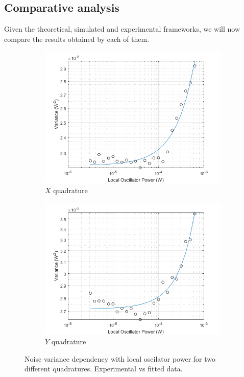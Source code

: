 \subsection{Comparative analysis}
%
%
Given the theoretical, simulated and experimental frameworks, we will now compare the results obtained by each of them.
\\
%
\begin{figure}[H]
	\begin{subfigure}{.5\textwidth}
		\centering
		\includegraphics[width=.8\linewidth]{./sdf/optical_detection/figures/noise_exp_channel1.png}
		\caption{$X$ quadrature}
		\label{fig:noise-exp-1}
	\end{subfigure}%
	\begin{subfigure}{.5\textwidth}
		\centering
		\includegraphics[width=.8\linewidth]{./sdf/optical_detection/figures/noise_exp_channel3.png}
		\caption{$Y$ quadrature}
		\label{fig:noise-exp-3}
	\end{subfigure}
	\captionsetup{justification=centering}
	\caption{Noise variance dependency with local oscilator power for two different quadratures. Experimental vs fitted data.}
\end{figure}
